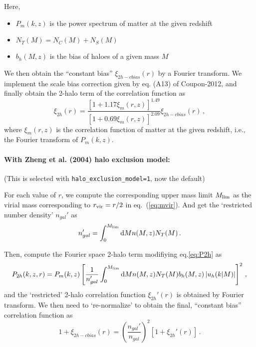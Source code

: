 \documentclass[10pt,a4paper]{article}
\begin{document}
Here,
\begin{itemize}
\item $P_m(k,z)$ is the power spectrum of matter at the given redshift
\item $N_T(M) = N_C(M) + N_S(M)$
\item $b_h(M,z)$ is the bias of haloes of a given mass $M$
\end{itemize}

We then obtain the ``constant bias'' $\xi_{2h-cbias}(r)$ by a Fourier transform. 
We implement the scale bias correction given by eq. (A13) of Coupon-2012, and finally obtain the 2-halo term of the correlation function as
\begin{equation}
  \label{eq:1}
  \xi_{2h}(r) = \frac{\left[ 1 + 1.17 \xi_m(r,z)\right]^{1.49}}{\left[ 1 + 0.69 \xi_m(r,z)\right]^{2.09}} \xi_{2h-cbias}(r) \, , 
\end{equation}
where $\xi_m(r,z)$ is the correlation function of matter at the given redshift, i.e., the Fourier transform of $P_m(k,z)$.


\paragraph{With Zheng et al. (2004) halo exclusion model:}

(This is selected with \texttt{halo\_exclusion\_model=1}, now the default)

For each value of $r$, we compute the corresponding upper mass limit $M_{\rm lim}$ as the virial mass corresponding to $r_{\rm vir} = r/2$ in eq.~(\ref{eq:mvir}). And get the `restricted number density' $n_{gal}'$ as
\begin{equation}
  \label{eq:2}
  n_{gal}' = \int_0^{M_{\rm lim}} \mathrm{d}M n(M,z) N_T(M) \, .
\end{equation}

Then, compute the Fourier space 2-halo term modifiying eq.\ref{eq:P2h} as
\begin{equation}
  \label{eq:3}
  P_{2h}(k,z, r) = P_m(k,z)\left[ \frac{1}{n_{gal}'} \int_0^{M_{\rm lim}} \mathrm{d}M n(M,z) N_T(M) b_h(M,z) \left| u_h(k|M)\right| \right]^2 \, ,
\end{equation}
and the `restricted' 2-halo correlation function $\xi_{2h}'(r)$ is obtained by Fourier transform. We then need to `re-normalize' to obtain the final, ``constant bias'' correlation function as
\begin{equation}
  \label{eq:4}
  1 + \xi_{2h-cbias}(r) = \left( \frac{n_{gal}'}{n_{gal}} \right)^2 \left[1 + \xi_{2h}'(r)\right] \, .
\end{equation}
\end{document}
